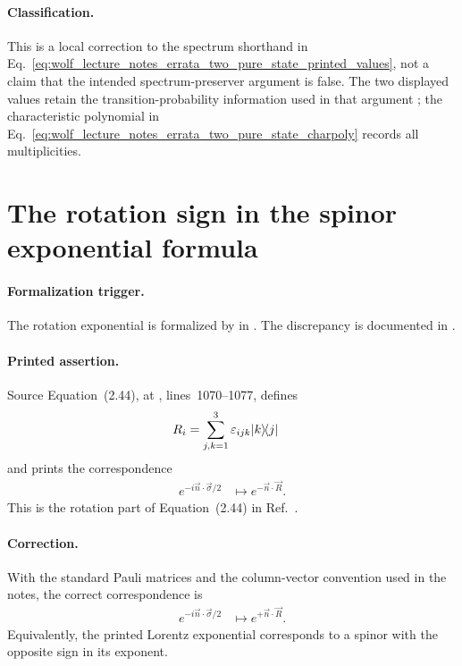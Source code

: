 \documentclass{article}
\begin{document}
\paragraph{Classification.}
This is a local correction to the spectrum shorthand in
Eq.~\ref{eq:wolf_lecture_notes_errata_two_pure_state_printed_values}, not a
claim that the intended spectrum-preserver argument is false. The two
displayed values retain the transition-probability information used in that
argument \cite{Wolf2012Quantum}; the characteristic polynomial in
Eq.~\ref{eq:wolf_lecture_notes_errata_two_pure_state_charpoly} records all
multiplicities.

\section{The rotation sign in the spinor exponential formula}
\label{sec:spinor-rotation-sign}

\paragraph{Formalization trigger.}
The rotation exponential is formalized by
 in
. The discrepancy
is documented in
.

\paragraph{Printed assertion.}
Source Equation~(2.44), at
, lines~1070--1077,
defines
\begin{align}
    R_i
        &=\sum_{j,k=1}^{3}\varepsilon_{ijk}|k\rangle\!\langle j|
    \label{eq:wolf_lecture_notes_errata_spinor_rotation_generator}
\end{align}
and prints the correspondence
\begin{align}
    e^{-i\vec n\cdot\vec\sigma/2}
        &\longmapsto e^{-\vec n\cdot\vec R}.
    \label{eq:wolf_lecture_notes_errata_spinor_printed_correspondence}
\end{align}
This is the rotation part of Equation~(2.44) in
Ref.~\cite{Wolf2012Quantum}.

\paragraph{Correction.}
With the standard Pauli matrices and the column-vector convention used in the
notes, the correct correspondence is
\begin{align}
    e^{-i\vec n\cdot\vec\sigma/2}
        &\longmapsto e^{+\vec n\cdot\vec R}.
    \label{eq:wolf_lecture_notes_errata_spinor_corrected_correspondence}
\end{align}
Equivalently, the printed Lorentz exponential corresponds to a spinor with the
opposite sign in its exponent.
\end{document}
